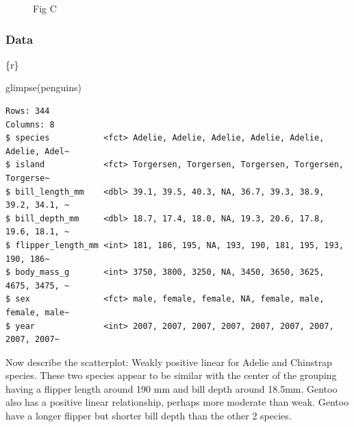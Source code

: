 \documentclass[
  letterpaper,
  DIV=11,
  numbers=noendperiod]{scrreprt}
\newenvironment{Shaded}{\begin{snugshade}}{\end{snugshade}}
\newcommand{\FunctionTok}[1]{\textcolor[rgb]{0.28,0.35,0.67}{#1}}
\newcommand{\InformationTok}[1]{\textcolor[rgb]{0.37,0.37,0.37}{#1}}
\newcommand{\NormalTok}[1]{\textcolor[rgb]{0.00,0.23,0.31}{#1}}
\begin{document}
\begin{tcolorbox}[enhanced jigsaw, colframe=quarto-callout-note-color-frame, breakable, colback=white, toprule=.15mm, leftrule=.75mm, left=2mm, opacityback=0, rightrule=.15mm, arc=.35mm, bottomrule=.15mm]
\begin{figure}[H]
{}

\caption{Fig C}

\end{figure}

\hypertarget{data-1}{%
\subsubsection*{Data}\label{data-1}}

\begin{Shaded}
\begin{Highlighting}[]
\InformationTok{\textasciigrave{}\textasciigrave{}\textasciigrave{}\{r\}}

\FunctionTok{glimpse}\NormalTok{(penguins)}
\InformationTok{\textasciigrave{}\textasciigrave{}\textasciigrave{}}
\end{Highlighting}
\end{Shaded}

\begin{verbatim}
Rows: 344
Columns: 8
$ species           <fct> Adelie, Adelie, Adelie, Adelie, Adelie, Adelie, Adel~
$ island            <fct> Torgersen, Torgersen, Torgersen, Torgersen, Torgerse~
$ bill_length_mm    <dbl> 39.1, 39.5, 40.3, NA, 36.7, 39.3, 38.9, 39.2, 34.1, ~
$ bill_depth_mm     <dbl> 18.7, 17.4, 18.0, NA, 19.3, 20.6, 17.8, 19.6, 18.1, ~
$ flipper_length_mm <int> 181, 186, 195, NA, 193, 190, 181, 195, 193, 190, 186~
$ body_mass_g       <int> 3750, 3800, 3250, NA, 3450, 3650, 3625, 4675, 3475, ~
$ sex               <fct> male, female, female, NA, female, male, female, male~
$ year              <int> 2007, 2007, 2007, 2007, 2007, 2007, 2007, 2007, 2007~
\end{verbatim}

\end{tcolorbox}

\begin{tcolorbox}[enhanced jigsaw, colframe=quarto-callout-important-color-frame, breakable, colback=white, toprule=.15mm, leftrule=.75mm, left=2mm, opacityback=0, rightrule=.15mm, arc=.35mm, bottomrule=.15mm]
Now describe the scatterplot: Weakly positive linear for Adelie and
Chinstrap species. These two species appear to be similar with the
center of the grouping having a flipper length around 190 mm and bill
depth around 18.5mm. Gentoo also has a positive linear relationship,
perhaps more moderate than weak. Gentoo have a longer flipper but
shorter bill depth than the other 2 species.
\end{tcolorbox}
\end{document}
